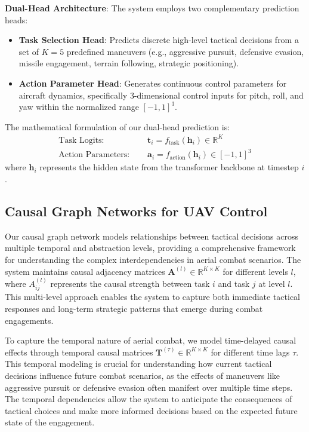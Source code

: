 \documentclass[12pt]{article}
\begin{document}
\textbf{Dual-Head Architecture}: The system employs two complementary prediction heads:
\begin{itemize}
    \item \textbf{Task Selection Head}: Predicts discrete high-level tactical decisions from a set of $K=5$ predefined maneuvers (e.g., aggressive pursuit, defensive evasion, missile engagement, terrain following, strategic positioning).
    \item \textbf{Action Parameter Head}: Generates continuous control parameters for aircraft dynamics, specifically 3-dimensional control inputs for pitch, roll, and yaw within the normalized range $[-1, 1]^3$.
\end{itemize}

The mathematical formulation of our dual-head prediction is:
\begin{align}
\text{Task Logits: } &\quad \mathbf{t}_i = f_{\text{task}}(\mathbf{h}_i) \in \mathbb{R}^K \\
\text{Action Parameters: } &\quad \mathbf{a}_i = f_{\text{action}}(\mathbf{h}_i) \in [-1,1]^3
\end{align}
where $\mathbf{h}_i$ represents the hidden state from the transformer backbone at timestep $i$.

\subsection{Causal Graph Networks for UAV Control}

Our causal graph network models relationships between tactical decisions across multiple temporal and abstraction levels, providing a comprehensive framework for understanding the complex interdependencies in aerial combat scenarios. The system maintains causal adjacency matrices $\mathbf{A}^{(l)} \in \mathbb{R}^{K \times K}$ for different levels $l$, where $A^{(l)}_{ij}$ represents the causal strength between task $i$ and task $j$ at level $l$. This multi-level approach enables the system to capture both immediate tactical responses and long-term strategic patterns that emerge during combat engagements.

To capture the temporal nature of aerial combat, we model time-delayed causal effects through temporal causal matrices $\mathbf{T}^{(\tau)} \in \mathbb{R}^{K \times K}$ for different time lags $\tau$. This temporal modeling is crucial for understanding how current tactical decisions influence future combat scenarios, as the effects of maneuvers like aggressive pursuit or defensive evasion often manifest over multiple time steps. The temporal dependencies allow the system to anticipate the consequences of tactical choices and make more informed decisions based on the expected future state of the engagement.
\end{document}
